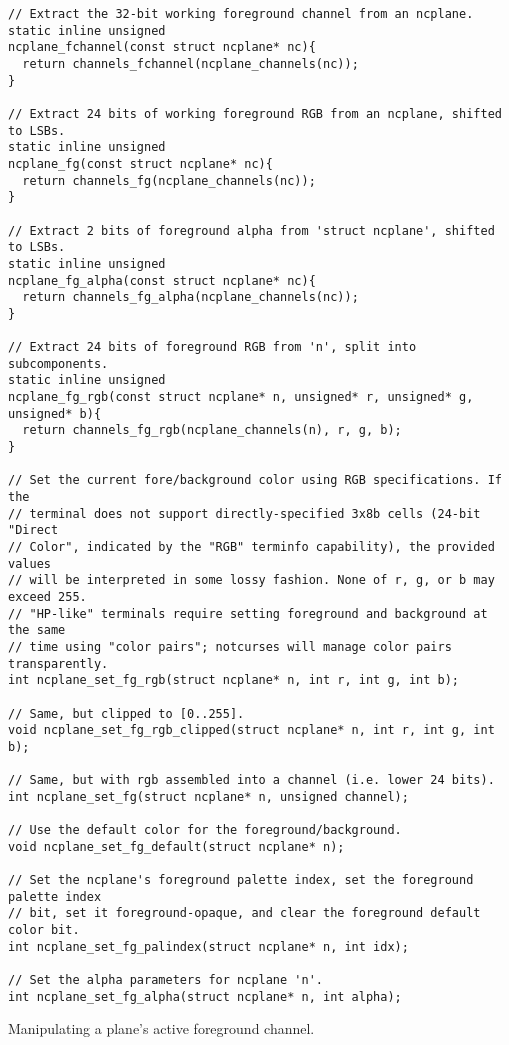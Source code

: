 \begin{listing}[!htbp]
\begin{verbatim}
// Extract the 32-bit working foreground channel from an ncplane.
static inline unsigned
ncplane_fchannel(const struct ncplane* nc){
  return channels_fchannel(ncplane_channels(nc));
}

// Extract 24 bits of working foreground RGB from an ncplane, shifted to LSBs.
static inline unsigned
ncplane_fg(const struct ncplane* nc){
  return channels_fg(ncplane_channels(nc));
}

// Extract 2 bits of foreground alpha from 'struct ncplane', shifted to LSBs.
static inline unsigned
ncplane_fg_alpha(const struct ncplane* nc){
  return channels_fg_alpha(ncplane_channels(nc));
}

// Extract 24 bits of foreground RGB from 'n', split into subcomponents.
static inline unsigned
ncplane_fg_rgb(const struct ncplane* n, unsigned* r, unsigned* g, unsigned* b){
  return channels_fg_rgb(ncplane_channels(n), r, g, b);
}

// Set the current fore/background color using RGB specifications. If the
// terminal does not support directly-specified 3x8b cells (24-bit "Direct
// Color", indicated by the "RGB" terminfo capability), the provided values
// will be interpreted in some lossy fashion. None of r, g, or b may exceed 255.
// "HP-like" terminals require setting foreground and background at the same
// time using "color pairs"; notcurses will manage color pairs transparently.
int ncplane_set_fg_rgb(struct ncplane* n, int r, int g, int b);

// Same, but clipped to [0..255].
void ncplane_set_fg_rgb_clipped(struct ncplane* n, int r, int g, int b);

// Same, but with rgb assembled into a channel (i.e. lower 24 bits).
int ncplane_set_fg(struct ncplane* n, unsigned channel);

// Use the default color for the foreground/background.
void ncplane_set_fg_default(struct ncplane* n);

// Set the ncplane's foreground palette index, set the foreground palette index
// bit, set it foreground-opaque, and clear the foreground default color bit.
int ncplane_set_fg_palindex(struct ncplane* n, int idx);

// Set the alpha parameters for ncplane 'n'.
int ncplane_set_fg_alpha(struct ncplane* n, int alpha);
\end{verbatim}
\caption{Manipulating a plane's active foreground channel.}
\label{listing:planefg}
\end{listing}

